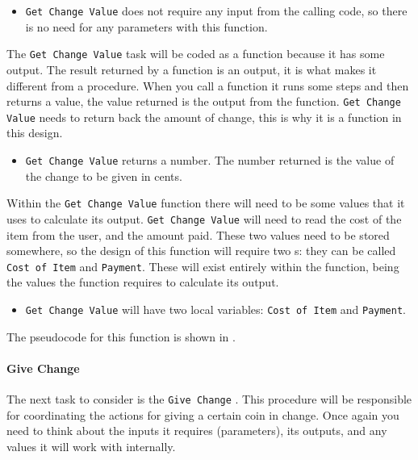 \begin{itemize}
  \item \texttt{Get Change Value} does not require any input from the calling code, so there is no need for any parameters with this function.
\end{itemize}

The \texttt{Get Change Value} task will be coded as a function because it has some output. The result returned by a function is an output, it is what makes it different from a procedure. When you call a function it runs some steps and then returns a value, the value returned is the output from the function. \texttt{Get Change Value} needs to return back the amount of change, this is why it is a function in this design.

\begin{itemize}
  \item \texttt{Get Change Value} returns a number. The number returned is the value of the change to be given in cents.
\end{itemize}

Within the \texttt{Get Change Value} function there will need to be some values that it uses to calculate its output. \texttt{Get Change Value} will need to read the cost of the item from the user, and the amount paid. These two values need to be stored somewhere, so the design of this function will require two s: they can be called \texttt{Cost of Item} and \texttt{Payment}. These will exist entirely within the function, being the values the function requires to calculate its output.

\begin{itemize}
  \item \texttt{Get Change Value} will have two local variables: \texttt{Cost of Item} and \texttt{Payment}.
\end{itemize}

The pseudocode for this function is shown in .



\paragraph{Give Change} %
\label{par:give_change}
The next task to consider is the \texttt{Give Change} . This procedure will be responsible for coordinating the actions for giving a certain coin in change. Once again you need to think about the inputs it requires (parameters), its outputs, and any values it will work with internally.

